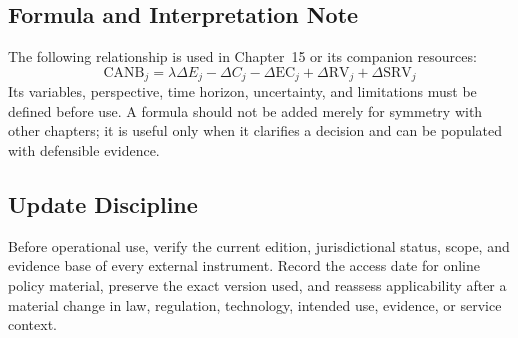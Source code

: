 \subsection{Formula and Interpretation Note}
The following relationship is used in Chapter~15 or its companion resources:
\begin{equation}
\mathrm{CANB}_j=\lambda\Delta E_j-\Delta C_j-\Delta \mathrm{EC}_j+\Delta \mathrm{RV}_j+\Delta \mathrm{SRV}_j
\label{eq:comp-ch15-reference-formula}
\end{equation}
Its variables, perspective, time horizon, uncertainty, and limitations must be
defined before use. A formula should not be added merely for symmetry with other
chapters; it is useful only when it clarifies a decision and can be populated with
defensible evidence.

\subsection{Update Discipline}
Before operational use, verify the current edition, jurisdictional status, scope,
and evidence base of every external instrument. Record the access date for online
policy material, preserve the exact version used, and reassess applicability after a
material change in law, regulation, technology, intended use, evidence, or service
context.
